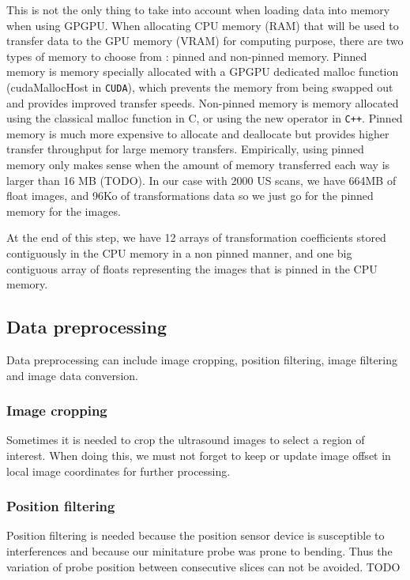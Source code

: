 \documentclass[12pt,journal,compsoc]{IEEEtran}
\begin{document}
This is not the only thing to take into account when loading data into memory when using GPGPU.
When allocating CPU memory (RAM) that will be used to transfer data to the GPU memory (VRAM) for computing purpose, there are two types of memory to choose from : pinned and non-pinned memory. 
Pinned memory is memory specially allocated with a GPGPU dedicated malloc function (cudaMallocHost in \texttt{CUDA}), which prevents the memory from being swapped out and provides improved transfer speeds. 
Non-pinned memory is memory allocated using the classical malloc function in C, or using the new operator in \texttt{C++}. 
Pinned memory is much more expensive to allocate and deallocate but provides higher transfer throughput for large memory transfers.
Empirically, using pinned memory only makes sense when the amount of memory transferred each way is larger than 16 MB (TODO). 
In our case with 2000 US scans, we have 664MB of float images, and 96Ko of transformations data so we just go for the pinned memory for the images. \par

At the end of this step, we have 12 arrays of transformation coefficients stored contiguously in the CPU memory in a non pinned manner, and one big contiguous array of floats representing the images that is pinned in the CPU memory. 

\subsection{Data preprocessing}

Data preprocessing can include image cropping, position filtering, image filtering and image data conversion.\par

\subsubsection{Image cropping}
Sometimes it is needed to crop the ultrasound images to select a region of interest. When doing this, we must not forget to keep or update image offset in local image coordinates for further processing. 

\subsubsection{Position filtering}
Position filtering is needed because the position sensor device is susceptible to interferences and because our minitature probe was prone to bending. Thus the variation of probe position between consecutive slices can not be avoided. TODO\par
\end{document}
